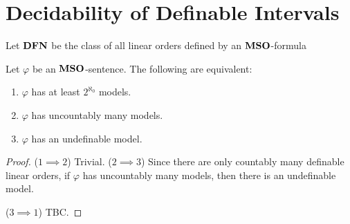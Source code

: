 \section{Decidability of Definable Intervals}

\begin{definition}
    Let $\mathbf{DFN}$ be the class of all linear orders defined
    by an $\mathbf{MSO}$-formula
\end{definition}


\begin{theorem}
    Let $\varphi$ be an $\mathbf{MSO}$-sentence. The following are equivalent:
    \begin{enumerate}
        \item $\varphi$ has at least $2^{\aleph_0}$ models.
        \item $\varphi$ has uncountably many models.
        \item $\varphi$ has an undefinable model.
    \end{enumerate}
\end{theorem}

\begin{proof}
    ($1 \implies 2$) Trivial.
    ($2 \implies 3$) Since there are only countably many
    definable linear orders, if $\varphi$ has uncountably many models,
    then there is an undefinable model.
    
    ($3 \implies 1$) TBC.
\end{proof}